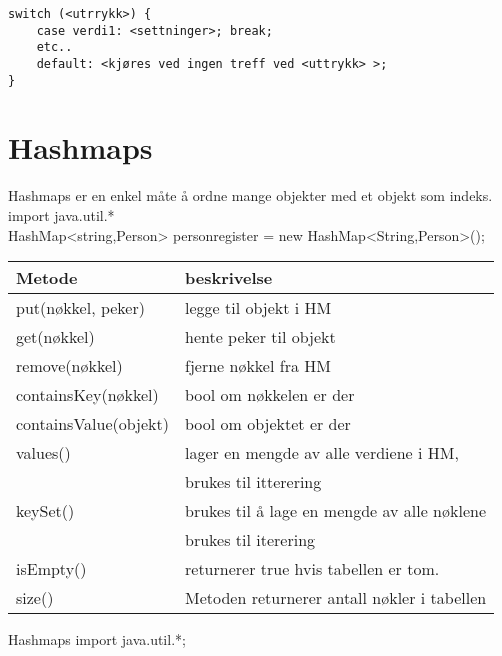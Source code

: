\documentclass[a4paper,norsk,10pt]{article}
\begin{document}
\begin{verbatim}
switch (<utrrykk>) {
    case verdi1: <settninger>; break;
    etc..
    default: <kjøres ved ingen treff ved <uttrykk> >;
}
\end{verbatim}
\section{Hashmaps}
\label{sec-6}


  Hashmaps er en enkel måte å ordne mange objekter med et objekt som
  indeks.\\
  import java.util.*\\
  HashMap<string,Person> personregister = new HashMap<String,Person>();\\
  

\begin{center}
\begin{tabular}{ll}
\hline
 Metode                 &  beskrivelse                                  \\
\hline
 put(nøkkel, peker)     &  legge til objekt i HM                        \\
\hline
 get(nøkkel)            &  hente peker til objekt                       \\
\hline
 remove(nøkkel)         &  fjerne nøkkel fra HM                         \\
\hline
 containsKey(nøkkel)    &  bool om nøkkelen er der                      \\
\hline
 containsValue(objekt)  &  bool om objektet er der                      \\
\hline
 values()               &  lager en mengde av alle verdiene i HM,       \\
                        &  brukes til itterering                        \\
\hline
 keySet()               &  brukes til å lage en mengde av alle nøklene  \\
                        &  brukes til iterering                         \\
\hline
 isEmpty()              &  returnerer true hvis tabellen er tom.        \\
\hline
 size()                 &  Metoden returnerer antall nøkler i tabellen  \\
\hline
\end{tabular}
\end{center}



Hashmaps
import java.util.*;
\end{document}
